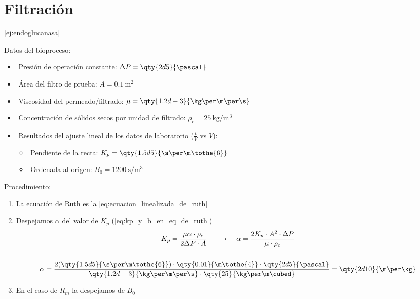 

    \section{Filtración}


[ej:endoglucanasa]{
    Datos del bioproceso:
    \begin{itemize}
        \item​ Presión de operación constante: $\Delta P = \qty{2d5}{\pascal}$ 
        \item​ Área del filtro de prueba: $A = \qty{0.1}{\m\squared}$ 
        \item​ Viscosidad del permeado/filtrado: $\mu = \qty{1.2d-3}{\kg\per\m\per\s}$ 
        \item​ Concentración de sólidos secos por unidad de filtrado: $\rho_{c} = \qty{25}{\kg\per\m\cubed}$ 
        \item​ Resultados del ajuste lineal de los datos de laboratorio ($\frac{t}{V}$ vs $V$): 
            \begin{itemize}
                \item​ Pendiente de la recta: $K_{p} = \qty{1.5d5}{\s\per\m\tothe{6}}$
                \item​ Ordenada al origen: $B_{0} = \qty{1200}{\s\per\m\cubed}$
            \end{itemize}    
    \end{itemize}
    Procedimiento:
    \begin{enumerate}
        \item La ecuación de Ruth es la \autoref{eq:ecuacion_linealizada_de_ruth}
        \item Despejamos $\alpha$ del valor de $K_{p}$ (\autoref{eq:kp_y_b_en_eq_de_ruth}) \begin{gather*}
            K_{p} = \frac{\mu\alpha\cdot\rho_{c}}{2\Delta P \cdot A} \quad\longrightarrow\quad \alpha = \frac{2K_{p}\cdot A^{2} \cdot \Delta P}{\mu\cdot\rho_{c}}
            \\\\
            \alpha = \frac{2(\qty{1.5d5}{\s\per\m\tothe{6}})\cdot\qty{0.01}{\m\tothe{4}}\cdot\qty{2d5}{\pascal}}{\qty{1.2d-3}{\kg\per\m\per\s}\cdot\qty{25}{\kg\per\m\cubed}} = \qty{2d10}{\m\per\kg}
            \end{gather*}
        \item En el caso de $R_{m}$ la despejamos de $B_{0}$ \begin{gather*}

\end{gather*}
\end{enumerate}}
